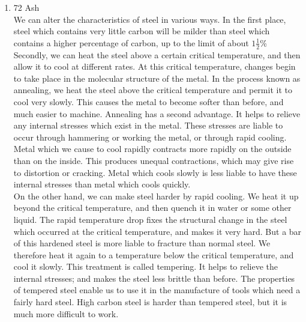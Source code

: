 \documentclass[12pt]{article}
\begin{document}
\begin{enumerate}
      Every language has its own popular music, like it has its own classical music. Indian popular music, often known as Indi-pop or Hindi pop is a form of pop music in India. It is fusion of various Indian folk and classical music styles and is also influenced by modern bests from different parts of the world. The major push given to Indi-pop was from Pakistani singer, Nazia Hassan. Indian pop has taken another interesting turn with the "remixing" of old Indian film songs-an attempt to make them sound more modern by adding new beats. These remixes have become very popular among the younger generation; they give the old melodies new life and vigour. The purists among the older generation however maintain that the beauty of the song is lost.

    \item 72 Ash\\
      We can alter the characteristics of steel in various ways. In the first place, steel which contains very little carbon will be milder than steel which contains a higher percentage of carbon, up to the limit of about $1\frac{1}{2}$\%  Secondly, we can heat the steel above a certain critical temperature, and then allow it to cool at different rates. At this critical temperature, changes begin to take place in the molecular structure of the metal. In the process known as annealing, we heat the steel above the critical temperature and permit it to cool very slowly. This causes the metal to become softer than before, and much easier to machine. Annealing has a second advantage. It helps to relieve any internal stresses which exist in the metal. These stresses are liable to occur through hammering or working the metal, or through rapid cooling. Metal which we cause to cool rapidly contracts more rapidly on the outside than on the inside. This produces unequal contractions, which may give rise to distortion or cracking. Metal which cools slowly is less liable to have these internal stresses than metal which cools quickly.\\

      On the other hand, we can make steel harder by rapid cooling. We heat it up beyond the critical temperature, and then quench it in water or some other liquid. The rapid temperature drop fixes the structural change in the steel which occurred at the critical temperature, and makes it very hard. But a bar of this hardened steel is more liable to fracture than normal steel. We therefore heat it again to a temperature below the critical temperature, and cool it slowly. This treatment is called tempering. It helps to relieve the internal stresses; and makes the steel less brittle than before. The properties of tempered steel enable us to use it in the manufacture of tools which need a fairly hard steel. High carbon steel is harder than tempered steel, but it is much more difficult to work.\\


\end{enumerate}
\end{document}

